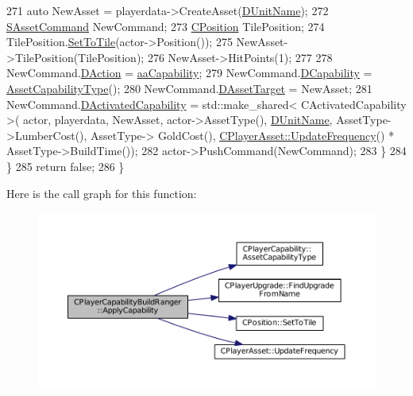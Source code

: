 \begin{DoxyCode}
271             \textcolor{keyword}{auto} NewAsset = playerdata->CreateAsset(\hyperlink{classCPlayerCapabilityBuildRanger_a4e85674699365fe1e77bcb2a1996d7ba}{DUnitName});
272             \hyperlink{structSAssetCommand}{SAssetCommand} NewCommand;
273             \hyperlink{classCPosition}{CPosition} TilePosition;
274             TilePosition.\hyperlink{classCPosition_ae302aa21792de64c97de29e2cbbfeb94}{SetToTile}(actor->Position());
275             NewAsset->TilePosition(TilePosition);
276             NewAsset->HitPoints(1);
277             
278             NewCommand.\hyperlink{structSAssetCommand_a8edd3b3d59a76d5514ba403bc8076a75}{DAction} = \hyperlink{GameDataTypes_8h_ab47668e651a3032cfb9c40ea2d60d670acf9fb164e8abd71c71f4a8c7fda360d4}{aaCapability};
279             NewCommand.\hyperlink{structSAssetCommand_a734ea7c6847457b437360f333f570ff9}{DCapability} = \hyperlink{classCPlayerCapability_a433bb196cd6ab6a932f1cac102b3aa98}{AssetCapabilityType}();
280             NewCommand.\hyperlink{structSAssetCommand_a3d9b43f6e59c386c48c41a65448a0c39}{DAssetTarget} = NewAsset;
281             NewCommand.\hyperlink{structSAssetCommand_ad8beda19520811cc70fe1eab16c774dd}{DActivatedCapability} = std::make\_shared< CActivatedCapability >(
      actor, playerdata, NewAsset, actor->AssetType(), \hyperlink{classCPlayerCapabilityBuildRanger_a4e85674699365fe1e77bcb2a1996d7ba}{DUnitName}, AssetType->LumberCost(), AssetType->
      GoldCost(), \hyperlink{classCPlayerAsset_a0aff85b9552967a42f4f3f42cb59c19f}{CPlayerAsset::UpdateFrequency}() * AssetType->BuildTime());
282             actor->PushCommand(NewCommand);
283         \}
284     \}
285     \textcolor{keywordflow}{return} \textcolor{keyword}{false};
286 \}
\end{DoxyCode}
Here is the call graph for this function\+:\nopagebreak
\begin{figure}[H]
\begin{center}
\leavevmode
\includegraphics[width=350pt]{classCPlayerCapabilityBuildRanger_a113a97c3d833f206d333cb0e2e37aa31_cgraph}
\end{center}
\end{figure}
\hypertarget{classCPlayerCapabilityBuildRanger_a2e688d8f68ab53402afe9303dd28754a}{}\label{classCPlayerCapabilityBuildRanger_a2e688d8f68ab53402afe9303dd28754a} 
